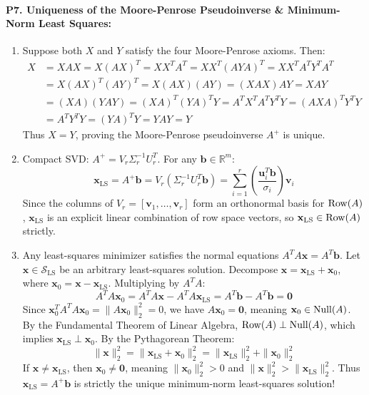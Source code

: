 \paragraph{P7. Uniqueness of the Moore-Penrose Pseudoinverse \& Minimum-Norm Least Squares:}
\begin{enumerate}[label=(\alph*)]
    \item Suppose both $X$ and $Y$ satisfy the four Moore-Penrose axioms. Then:
    \begin{align*}
    X &= X A X = X (A X)^T = X X^T A^T = X X^T (A Y A)^T = X X^T A^T Y^T A^T \\
    &= X (A X)^T (A Y)^T = X (A X) (A Y) = (X A X) A Y = X A Y \\
    &= (X A) (Y A Y) = (X A)^T (Y A)^T Y = A^T X^T A^T Y^T Y = (A X A)^T Y^T Y \\
    &= A^T Y^T Y = (Y A)^T Y = Y A Y = Y
    \end{align*}
    Thus $X = Y$, proving the Moore-Penrose pseudoinverse $A^+$ is unique.
    \item Compact SVD: $A^+ = V_r \Sigma_r^{-1} U_r^T$. For any $\mathbf{b} \in \mathbb{R}^m$:
    \[
    \mathbf{x}_{\text{LS}} = A^+ \mathbf{b} = V_r (\Sigma_r^{-1} U_r^T \mathbf{b}) = \sum_{i=1}^r \left( \frac{\mathbf{u}_i^T \mathbf{b}}{\sigma_i} \right) \mathbf{v}_i
    \]
    Since the columns of $V_r = [\mathbf{v}_1, \dots, \mathbf{v}_r]$ form an orthonormal basis for $\operatorname{Row}(A)$, $\mathbf{x}_{\text{LS}}$ is an explicit linear combination of row space vectors, so $\mathbf{x}_{\text{LS}} \in \operatorname{Row}(A)$ strictly.
    \item Any least-squares minimizer satisfies the normal equations $A^T A \mathbf{x} = A^T \mathbf{b}$.
    Let $\mathbf{x} \in \mathcal{S}_{\text{LS}}$ be an arbitrary least-squares solution. Decompose $\mathbf{x} = \mathbf{x}_{\text{LS}} + \mathbf{x}_0$, where $\mathbf{x}_0 = \mathbf{x} - \mathbf{x}_{\text{LS}}$.
    Multiplying by $A^T A$:
    \[
    A^T A \mathbf{x}_0 = A^T A \mathbf{x} - A^T A \mathbf{x}_{\text{LS}} = A^T \mathbf{b} - A^T \mathbf{b} = \mathbf{0}
    \]
    Since $\mathbf{x}_0^T A^T A \mathbf{x}_0 = \|A\mathbf{x}_0\|_2^2 = 0$, we have $A\mathbf{x}_0 = \mathbf{0}$, meaning $\mathbf{x}_0 \in \operatorname{Null}(A)$.
    By the Fundamental Theorem of Linear Algebra, $\operatorname{Row}(A) \perp \operatorname{Null}(A)$, which implies $\mathbf{x}_{\text{LS}} \perp \mathbf{x}_0$.
    By the Pythagorean Theorem:
    \[
    \|\mathbf{x}\|_2^2 = \|\mathbf{x}_{\text{LS}} + \mathbf{x}_0\|_2^2 = \|\mathbf{x}_{\text{LS}}\|_2^2 + \|\mathbf{x}_0\|_2^2
    \]
    If $\mathbf{x} \ne \mathbf{x}_{\text{LS}}$, then $\mathbf{x}_0 \ne \mathbf{0}$, meaning $\|\mathbf{x}_0\|_2^2 > 0$ and $\|\mathbf{x}\|_2^2 > \|\mathbf{x}_{\text{LS}}\|_2^2$.
    Thus $\mathbf{x}_{\text{LS}} = A^+ \mathbf{b}$ is strictly the unique minimum-norm least-squares solution!
\end{enumerate}

